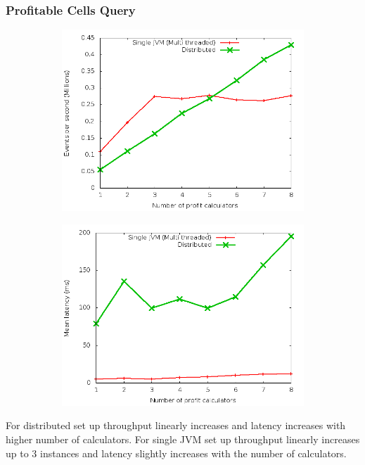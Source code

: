 \documentclass[handout]{beamer}
\begin{document}
\begin{frame}
\frametitle{Profitable Cells Query}

\begin{figure}
        \centering
        \begin{subfigure}[b]{0.45\textwidth}
                \includegraphics[width=\textwidth]{throughput_profit.png}
        \end{subfigure}
        \begin{subfigure}[b]{0.45\textwidth}
                \includegraphics[width=\textwidth]{latency_profit.png}
        \end{subfigure}
\end{figure}

\footnotesize For distributed set up throughput linearly increases and latency increases with higher number of calculators. For single JVM set up throughput linearly increases up to 3 instances and latency slightly increases with the number of calculators. 

\end{frame}
\end{document}
